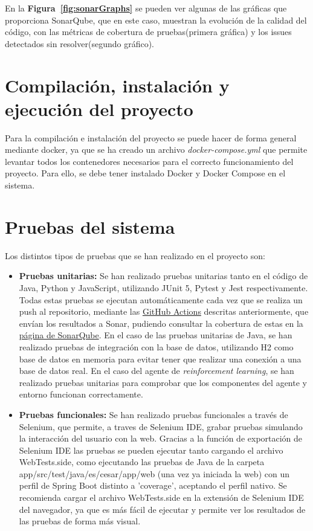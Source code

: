 En la \textbf{Figura~\ref{fig:sonarGraphs}} se pueden ver algunas de las gráficas que proporciona SonarQube, que en este caso, muestran la evolución de la calidad del código, con las métricas de cobertura de pruebas(primera gráfica) y los issues detectados sin resolver(segundo gráfico). 


\section{Compilación, instalación y ejecución del proyecto}
\label{sec:compilacion}
Para la compilación e instalación del proyecto se puede hacer de forma general mediante docker, ya que se ha creado un archivo \textit{docker-compose.yml} que permite levantar todos los contenedores necesarios para el correcto funcionamiento del proyecto. Para ello, se debe tener instalado Docker y Docker Compose en el sistema.

\section{Pruebas del sistema}
\label{sec:pruebas}

Los distintos tipos de pruebas que se han realizado en el proyecto son:
\begin{itemize}
    \item \textbf{Pruebas unitarias:} Se han realizado pruebas unitarias tanto  en el código de Java, Python y JavaScript, utilizando JUnit 5, Pytest y Jest respectivamente. Todas estas pruebas se ejecutan automáticamente cada vez que se realiza un push al repositorio, mediante las \hyperref[subsec:acciones]{GitHub Actions} descritas anteriormente, que envían los resultados a Sonar, pudiendo consultar la cobertura de estas en la \hyperref[subsec:sonarqube]{página de SonarQube}. 
    En el caso de las pruebas unitarias de Java, se han realizado pruebas de integración con la base de datos, utilizando H2 como base de datos en memoria para evitar tener que realizar una conexión a una base de datos real. En el caso del agente de \textit{reinforcement learning}, se han realizado pruebas unitarias para comprobar que los componentes del agente y entorno funcionan correctamente.
    \item \textbf{Pruebas funcionales:} Se han realizado pruebas funcionales a través de Selenium, que permite, a traves de Selenium IDE, grabar pruebas simulando la interacción del usuario con la web. Gracias a la función de exportación de Selenium IDE las pruebas se pueden ejecutar tanto cargando el archivo WebTests.side, como ejecutando las pruebas de Java de la carpeta app/src/test/java/es/cesar/app/web (una vez ya iniciada la web) con un perfil de Spring Boot distinto a 'coverage', aceptando el perfil nativo. Se recomienda cargar el archivo WebTests.side en la extensión de Selenium IDE del navegador, ya que es más fácil de ejecutar y permite ver los resultados de las pruebas de forma más visual.
\end{itemize}

